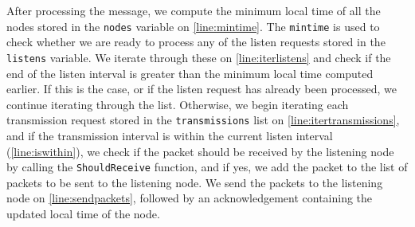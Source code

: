 After processing the message, we compute the minimum local time of all the nodes stored in the \texttt{nodes} variable on \autoref{line:mintime}. The \texttt{mintime} is used to check whether we are ready to process any of the listen requests stored in the \texttt{listens} variable. We iterate through these on \autoref{line:iterlistens} and check if the end of the listen interval is greater than the minimum local time computed earlier. If this is the case, or if the listen request has already been processed, we continue iterating through the list. Otherwise, we begin iterating each transmission request stored in the \texttt{transmissions} list on \autoref{line:itertransmissions}, and if the transmission interval is within the current listen interval (\autoref{line:iswithin}), we check if the packet should be received by the listening node by calling the \texttt{ShouldReceive} function, and if yes, we add the packet to the list of packets to be sent to the listening node. We send the packets to the listening node on \autoref{line:sendpackets}, followed by an acknowledgement containing the updated local time of the node.\medbreak

